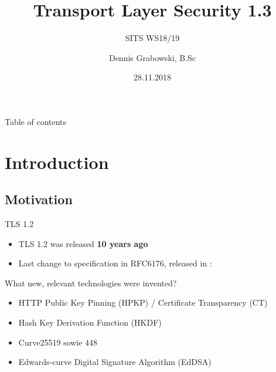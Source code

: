 \documentclass{f4_beamer_metropolis}
\title{Transport Layer Security 1.3}
\subtitle{SITS WS18/19}
\author{Dennis Grabowski, B.Sc}
\date{28.11.2018}
\begin{document}
\begin{frame}{Table of contents}
    \tableofcontents[hideallsubsections]
  \end{frame}

\section{Introduction}

\subsection{Motivation}

\begin{frame}{TLS 1.2}
\begin{itemize}
  \item TLS 1.2 was released \textbf{10 years ago}
  \item Last change to specification in RFC6176, released in \textbf{\citeyear{RFC6176}}: \newline
  \textit{}

\end{itemize}
\end{frame}

\begin{frame}{What new, relevant technologies were invented?}
  \begin{itemize}
    \item HTTP Public Key Pinning (HPKP) / Certificate Transparency (CT)
    \item Hash Key Derivation Function (HKDF)
    \item Curve25519 sowie 448
    \item Edwards-curve Digital Signature Algorithm (EdDSA)
  \end{itemize}

  \end{frame}
\end{document}
